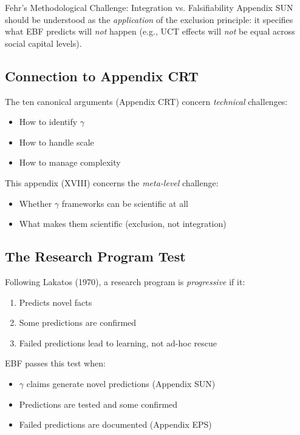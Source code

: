 \begin{chapter}{Fehr's Methodological Challenge: Integration vs. Falsifiability}
Appendix SUN should be understood as the \textit{application} of the exclusion principle: it specifies what EBF predicts will \textit{not} happen (e.g., UCT effects will \textit{not} be equal across social capital levels).

\subsection{Connection to Appendix CRT}

The ten canonical arguments (Appendix CRT) concern \textit{technical} challenges:
\begin{itemize}[noitemsep]
    \item How to identify $\gamma$
    \item How to handle scale
    \item How to manage complexity
\end{itemize}

This appendix (XVIII) concerns the \textit{meta-level} challenge:
\begin{itemize}[noitemsep]
    \item Whether $\gamma$ frameworks can be scientific at all
    \item What makes them scientific (exclusion, not integration)
\end{itemize}

\subsection{The Research Program Test}

Following Lakatos (1970), a research program is \textit{progressive} if it:
\begin{enumerate}
    \item Predicts novel facts
    \item Some predictions are confirmed
    \item Failed predictions lead to learning, not ad-hoc rescue
\end{enumerate}

EBF passes this test when:
\begin{itemize}[noitemsep]
    \item $\gamma$ claims generate novel predictions (Appendix SUN)
    \item Predictions are tested and some confirmed
    \item Failed predictions are documented (Appendix EPS)
\end{itemize}


\end{chapter}
